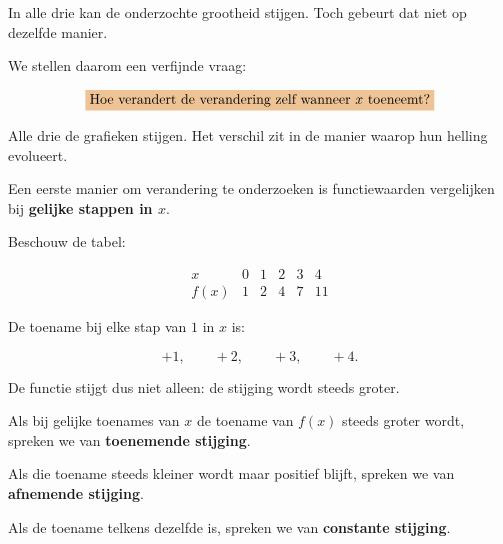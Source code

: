 \documentclass{ximera}
\begin{document}
In alle drie kan de onderzochte grootheid stijgen.
Toch gebeurt dat niet op dezelfde manier.

We stellen daarom een verfijnde vraag:

\[
\important{
\text{Hoe verandert de verandering zelf wanneer }x\text{ toeneemt?}
}
\]

\begin{center}
\end{center}

Alle drie de grafieken stijgen. Het verschil zit in de manier waarop hun helling evolueert.




Een eerste manier om verandering te onderzoeken is functiewaarden vergelijken
bij \textbf{gelijke stappen in \(x\)}.

Beschouw de tabel:

\[
\begin{array}{c|ccccc}
x&0&1&2&3&4\\
\hline
f(x)&1&2&4&7&11
\end{array}
\]

De toename bij elke stap van \(1\) in \(x\) is:

\[
+1,\qquad +2,\qquad +3,\qquad +4.
\]

De functie stijgt dus niet alleen: de stijging wordt steeds groter.

\begin{definitie}
Als bij gelijke toenames van \(x\) de toename van \(f(x)\)
steeds groter wordt, spreken we van \textbf{toenemende stijging}.

Als die toename steeds kleiner wordt maar positief blijft,
spreken we van \textbf{afnemende stijging}.

Als de toename telkens dezelfde is, spreken we van
\textbf{constante stijging}.
\end{definitie}
\end{document}
